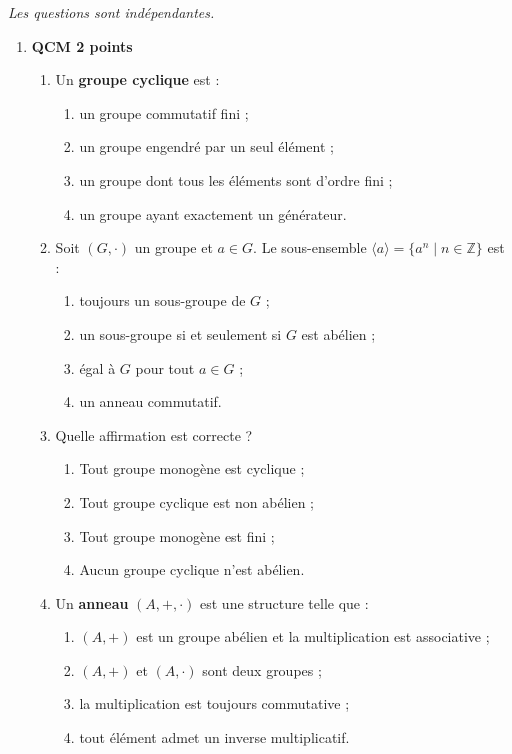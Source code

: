 \documentclass[10pt,openbib,a4paper,openright,a4paper]{article}%
\begin{document}
\textit{Les questions sont indépendantes.} 
\begin{enumerate}
	\item \textbf{QCM 2 points}

\begin{enumerate}

\item Un \textbf{groupe cyclique} est :
\begin{enumerate}
\item un groupe commutatif fini ;
\item un groupe engendré par un seul élément ;
\item un groupe dont tous les éléments sont d’ordre fini ;
\item un groupe ayant exactement un générateur.
\end{enumerate}

\item Soit $(G,\cdot)$ un groupe et $a\in G$. Le sous-ensemble
$\langle a\rangle = \{a^n \mid n\in\mathbb{Z}\}$ est :
\begin{enumerate}
\item toujours un sous-groupe de $G$ ;
\item un sous-groupe si et seulement si $G$ est abélien ;
\item égal à $G$ pour tout $a\in G$ ;
\item un anneau commutatif.
\end{enumerate}

\item Quelle affirmation est correcte ?
\begin{enumerate}
\item Tout groupe monogène est cyclique ;
\item Tout groupe cyclique est non abélien ;
\item Tout groupe monogène est fini ;
\item Aucun groupe cyclique n’est abélien.
\end{enumerate}

\item Un \textbf{anneau} $(A,+,\cdot)$ est une structure telle que :
\begin{enumerate}
\item $(A,+)$ est un groupe abélien et la multiplication est associative ;
\item $(A,+)$ et $(A,\cdot)$ sont deux groupes ;
\item la multiplication est toujours commutative ;
\item tout élément admet un inverse multiplicatif.
\end{enumerate}


\end{enumerate}
\end{enumerate}
\end{document}
